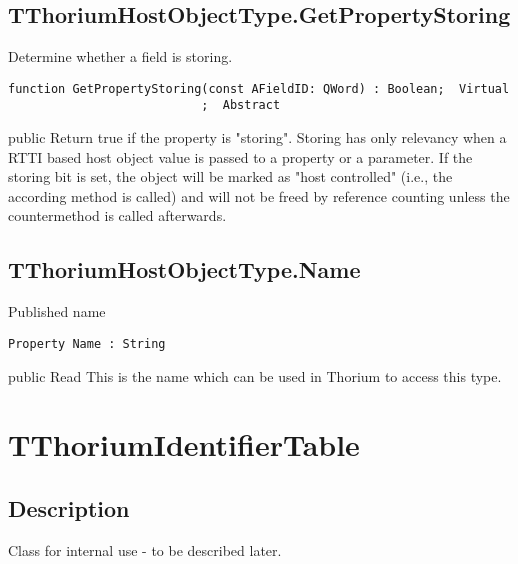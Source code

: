 \subsection{TThoriumHostObjectType.GetPropertyStoring}
\label{thoriumcorepkg:thorium:tthoriumhostobjecttype:getpropertystoring}
\begin{FPCList}
\Synopsis
Determine whether a field is storing.\Declaration 

\begin{verbatim}
function GetPropertyStoring(const AFieldID: QWord) : Boolean;  Virtual
                           ;  Abstract
\end{verbatim}
\Visibility
public
\Description
Return true if the property is "storing".  Storing has only relevancy when a RTTI based host object value is passed to a property or a parameter. If the storing bit is set, the object will be marked as "host controlled" (i.e., the according method is called) and will not be freed by reference counting unless the countermethod is called afterwards.\end{FPCList}
\subsection{TThoriumHostObjectType.Name}
\label{thoriumcorepkg:thorium:tthoriumhostobjecttype:name}
\begin{FPCList}
\Synopsis
Published name\Declaration 

\begin{verbatim}
Property Name : String
\end{verbatim}
\Visibility
public
\Access
Read
\Description
This is the name which can be used in Thorium to access this type.\end{FPCList}
\section{TThoriumIdentifierTable}
\label{thoriumcorepkg:thorium:tthoriumidentifiertable}
\subsection{Description}
Class for internal use - to be described later.%
